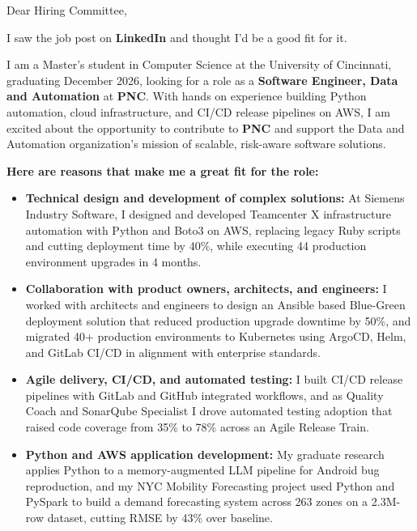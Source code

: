 \documentclass[11pt]{letter}
\date{}
\begin{document}
\begin{letter}{}

\opening{Dear Hiring Committee,}

I saw the job post on \textbf{LinkedIn} and thought I'd be a good fit for it.

I am a Master's student in Computer Science at the University of Cincinnati, graduating December 2026, looking for a role as a \textbf{Software Engineer, Data and Automation} at \textbf{PNC}. With hands on experience building Python automation, cloud infrastructure, and CI/CD release pipelines on AWS, I am excited about the opportunity to contribute to \textbf{PNC} and support the Data and Automation organization's mission of scalable, risk-aware software solutions.

\textbf{Here are reasons that make me a great fit for the role:}

\begin{itemize}[leftmargin=*, itemsep=0.45em]
    \item \textbf{Technical design and development of complex solutions:} At Siemens Industry Software, I designed and developed Teamcenter X infrastructure automation with Python and Boto3 on AWS, replacing legacy Ruby scripts and cutting deployment time by 40\%, while executing 44 production environment upgrades in 4 months.

    \item \textbf{Collaboration with product owners, architects, and engineers:} I worked with architects and engineers to design an Ansible based Blue-Green deployment solution that reduced production upgrade downtime by 50\%, and migrated 40+ production environments to Kubernetes using ArgoCD, Helm, and GitLab CI/CD in alignment with enterprise standards.

    \item \textbf{Agile delivery, CI/CD, and automated testing:} I built CI/CD release pipelines with GitLab and GitHub integrated workflows, and as Quality Coach and SonarQube Specialist I drove automated testing adoption that raised code coverage from 35\% to 78\% across an Agile Release Train.

    \item \textbf{Python and AWS application development:} My graduate research applies Python to a memory-augmented LLM pipeline for Android bug reproduction, and my NYC Mobility Forecasting project used Python and PySpark to build a demand forecasting system across 263 zones on a 2.3M-row dataset, cutting RMSE by 43\% over baseline.


\end{itemize}
\end{letter}
\end{document}

